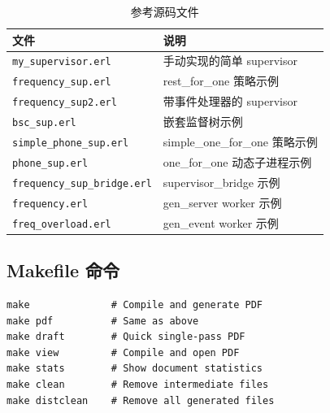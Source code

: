 \documentclass[a4paper,11pt]{article}
\begin{document}
\begin{table}[H]
\centering
\begin{tabular}{@{}ll@{}}
\toprule
\textbf{文件} & \textbf{说明} \\
\midrule
\texttt{my\_supervisor.erl} & 手动实现的简单 supervisor \\
\texttt{frequency\_sup.erl} & rest\_for\_one 策略示例 \\
\texttt{frequency\_sup2.erl} & 带事件处理器的 supervisor \\
\texttt{bsc\_sup.erl} & 嵌套监督树示例 \\
\texttt{simple\_phone\_sup.erl} & simple\_one\_for\_one 策略示例 \\
\texttt{phone\_sup.erl} & one\_for\_one 动态子进程示例 \\
\texttt{frequency\_sup\_bridge.erl} & supervisor\_bridge 示例 \\
\texttt{frequency.erl} & gen\_server worker 示例 \\
\texttt{freq\_overload.erl} & gen\_event worker 示例 \\
\bottomrule
\end{tabular}
\caption{参考源码文件}
\end{table}

\subsection{Makefile 命令}

\begin{lstlisting}[style=shellstyle, caption={doc/Makefile 可用命令}]
make              # Compile and generate PDF
make pdf          # Same as above
make draft        # Quick single-pass PDF
make view         # Compile and open PDF
make stats        # Show document statistics
make clean        # Remove intermediate files
make distclean    # Remove all generated files
\end{lstlisting}
\end{document}
